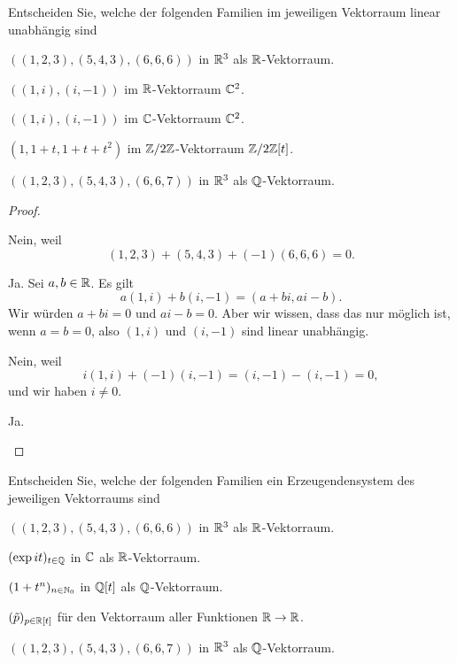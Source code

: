 \begin{Problem}
	Entscheiden Sie, welche der folgenden Familien im jeweiligen Vektorraum linear unabhängig sind
	\begin{parts}
	\item $((1, 2, 3), (5, 4, 3), (6, 6, 6))$ in $\mathbb{R}^3$ als $\mathbb{R}$-Vektorraum.
	\item $((1, i), (i, -1))$ im $\mathbb{R}$-Vektorraum $\mathbb{C}^2$.
	\item $((1, i), (i, -1))$ im $\mathbb{C}$-Vektorraum $\mathbb{C}^2$.
	\item $(1,1+t,1+t+t^2)$ im $\mathbb{Z} / 2\mathbb{Z}$-Vektorraum $\mathbb{Z} / 2\mathbb{Z}[t]$.
	\item $((1, 2, 3), (5, 4, 3), (6, 6, 7))$ in $\mathbb{R}^3$ als $\mathbb{Q}$-Vektorraum.
	\end{parts}
\end{Problem}
\begin{proof}
	\begin{parts}
	\item Nein, weil
		\[
			(1,2,3)+(5,4,3)+(-1)(6,6,6)=0
		.\] 
	\item Ja. Sei $a,b\in \mathbb{R}$. Es gilt
		\[
		a(1,i)+b(i,-1)=(a+bi,ai-b)
	.\]
	Wir würden $a+bi=0$ und $ai-b=0$. Aber wir wissen, dass das nur möglich ist, wenn $a=b=0$, also $(1,i)$ und $(i,-1)$ sind linear unabhängig.
\item Nein, weil
	\[
	i(1,i)+(-1)(i,-1)=(i,-1)-(i,-1)=0
	,\]
	und wir haben $i\neq 0$.
\item Ja. 
	\end{parts}
\end{proof}
\begin{Problem}
	Entscheiden Sie, welche der folgenden Familien ein Erzeugendensystem des jeweiligen Vektorraums sind
	\begin{parts}
	\item $((1, 2, 3), (5, 4, 3), (6, 6, 6))$ in $\mathbb{R}^3$ als  $\mathbb{R}$-Vektorraum.
	\item $(\exp it)_{t\in \mathbb{Q}}$ in $\mathbb{C}$ als $\mathbb{R}$-Vektorraum.
	\item $(1+t^n)_{n\in \mathbb{N}_0}$ in $\mathbb{Q}[t]$ als $\mathbb{Q}$-Vektorraum. 
	\item $(\tilde{p})_{p\in \mathbb{R}[t]}$ f\"{u}r den Vektorraum aller Funktionen $\mathbb{R}\to \mathbb{R}$.
	\item $((1, 2, 3), (5, 4, 3), (6, 6, 7))$ in $\mathbb{R}^3$ als $\mathbb{Q}$-Vektorraum. 
	\end{parts}
\end{Problem}
